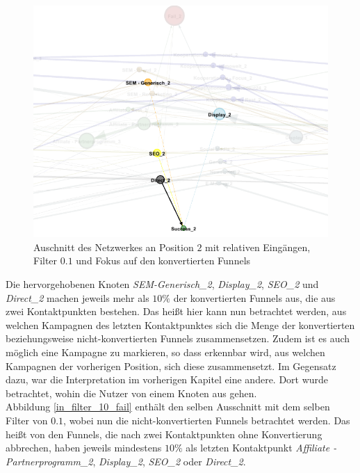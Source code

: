 \begin{figure}[H]
	\centering\includegraphics[scale=0.35]{in_filter_10_succ.png}\caption[Relative Eingänge mit Filter $0.1$ und Fokus auf Konvertierten]{Auschnitt des Netzwerkes an Position $2$ mit relativen Eingängen, Filter $0.1$ und Fokus auf den konvertierten Funnels}\label{in_filter_10_succ}
\end{figure}
\noindent Die hervorgehobenen Knoten \textit{SEM-Generisch\_2}, \textit{Display\_2}, \textit{SEO\_2} und \textit{Direct\_2} machen jeweils mehr als $10 \%$ der konvertierten Funnels aus, die aus zwei Kontaktpunkten bestehen. Das heißt hier kann nun betrachtet werden, aus welchen Kampagnen des letzten Kontaktpunktes sich die Menge der konvertierten beziehungsweise nicht-konvertierten Funnels zusammensetzen. Zudem ist es auch möglich eine Kampagne zu markieren, so dass erkennbar wird, aus welchen Kampagnen der vorherigen Position, sich diese zusammensetzt. Im Gegensatz dazu, war die Interpretation im vorherigen Kapitel eine andere. Dort wurde betrachtet, wohin die Nutzer von einem Knoten aus gehen.\\
Abbildung \ref{in_filter_10_fail} enthält den selben Ausschnitt mit dem selben Filter von $0.1$, wobei nun die nicht-konvertierten Funnels betrachtet werden. Das heißt von den Funnels, die nach zwei Kontaktpunkten ohne Konvertierung abbrechen, haben jeweils mindestens $10\%$ als letzten Kontaktpunkt \textit{Affiliate - Partnerprogramm\_2}, \textit{Display\_2}, \textit{SEO\_2} oder \textit{Direct\_2}.
